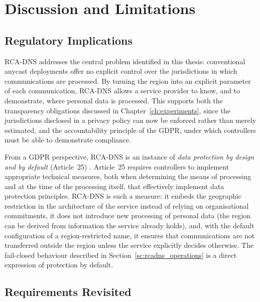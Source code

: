 \documentclass[
A4paper,                %
twoside,                %
openright,              %
chapterprefix=true,     %
12pt,                   %
headings=normal,        %
titlepage=on            %
]{book}
\begin{document}
\section{Discussion and Limitations}
\label{sc:rcadns_discussion}

\subsection{Regulatory Implications}
\label{sc:rcadns_discussion_regulatory}

RCA-DNS addresses the central problem identified in this thesis: conventional anycast deployments offer no explicit control over the jurisdictions in which communications are processed. By turning the region into an explicit parameter of each communication, RCA-DNS allows a service provider to know, and to demonstrate, where personal data is processed. This supports both the transparency obligations discussed in Chapter~\ref{ch:experiments}, since the jurisdictions disclosed in a privacy policy can now be enforced rather than merely estimated, and the accountability principle of the GDPR, under which controllers must be able to demonstrate compliance.

From a GDPR perspective, RCA-DNS is an instance of \textit{data protection by design and by default} (Article~25) \cite{REGULATIONSRelevance, GuidelinesBoard}. Article~25 requires controllers to implement appropriate technical measures, both when determining the means of processing and at the time of the processing itself, that effectively implement data protection principles. RCA-DNS is such a measure: it embeds the geographic restriction in the architecture of the service instead of relying on organisational commitments, it does not introduce new processing of personal data (the region can be derived from information the service already holds), and, with the default configuration of a region-restricted name, it ensures that communications are not transferred outside the region unless the service explicitly decides otherwise. The fail-closed behaviour described in Section~\ref{sc:rcadns_operations} is a direct expression of protection by default.

\subsection{Requirements Revisited}
\label{sc:rcadns_discussion_requirements}
\end{document}
